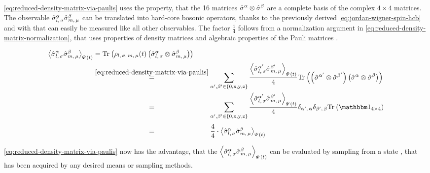 \autoref{eq:reduced-density-matrix-via-paulis} uses the property, that the 16 matrices $\pauli{$\alpha$}\otimes\pauli{$\beta$}$ are a complete basis of the complex $4\times 4$ matrices.
The observable $\pauli[l,\,\sigma]{$\alpha$}\pauli[m,\,\mu]{$\beta$}$ can be translated into hard-core bosonic operators, thanks to the previously derived \autoref{eq:jordan-wigner-spin-hcb} and with that can easily be measured like all other observables.
The factor $\frac{1}{4}$ follows from a normalization argument in \autoref{eq:reduced-density-matrix-normalization}, that uses properties of density matrices \cite{partialTraceEntanglementOfSubsystemsBlochVector} and algebraic properties of the Pauli matrices \cite{pauliPropertiesAndBlochVector}.

\begin{equation}
    \label{eq:reduced-density-matrix-normalization}
    \begin{split}
        {\left\langle \pauli[l,\,\sigma]{$\alpha$}\pauli[m,\,\mu]{$\beta$} \right\rangle}_{\psiOfT} &= \partialTrace{}{\rho_{l,\,\sigma,\,m,\,\mu} (t) \left(\pauli[l,\,\sigma]{$\alpha$}\otimes\pauli[m,\,\mu]{$\beta$}\right)}  \\
        &\stackrel{\ref{eq:reduced-density-matrix-via-paulis}}{=}\sum\limits_{\alpha',\beta'\in\left\{0,\text{x},\text{y},\text{z}\right\}} \frac{{\left\langle \pauli[l,\,\sigma]{$\alpha'$}\pauli[m,\,\mu]{$\beta'$} \right\rangle}_{\psiOfT}}{4}
        \partialTrace{}{\left(\pauli{$\alpha'$}\otimes\pauli{$\beta'$}\right)\left(\pauli{$\alpha$}\otimes\pauli{$\beta$}\right)}\\
        &\stackrel{\phantom{\ref{eq:reduced-density-matrix-via-paulis}}}{=}\sum\limits_{\alpha',\beta'\in\left\{0,\text{x},\text{y},\text{z}\right\}} \frac{{\left\langle \pauli[l,\,\sigma]{$\alpha'$}\pauli[m,\,\mu]{$\beta'$} \right\rangle}_{\psiOfT}}{4}
        \delta_{\alpha',\,\alpha}\delta_{\beta',\,\beta}\partialTrace{}{\one[4\times 4]}\\
        &\stackrel{\phantom{\ref{eq:reduced-density-matrix-via-paulis}}}{=}\frac{4}{4} \cdot {\left\langle \pauli[l,\,\sigma]{$\alpha$}\pauli[m,\,\mu]{$\beta$} \right\rangle}_{\psiOfT}
    \end{split}
\end{equation}

\autoref{eq:reduced-density-matrix-via-paulis} now has the advantage, that the ${\left\langle \pauli[l,\,\sigma]{$\alpha$}\pauli[m,\,\mu]{$\beta$} \right\rangle}_{\psiOfT}$ can be evaluated by sampling from a state \psiOfT, that has been acquired by any desired means or sampling methods.

